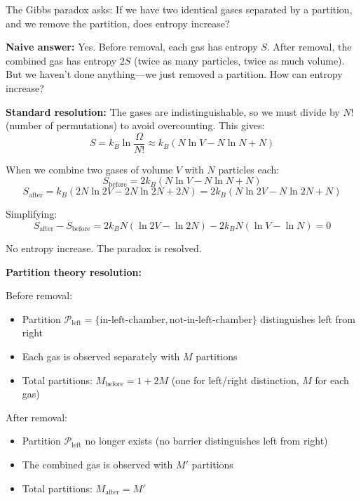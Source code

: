 \documentclass[twocolumn,10pt]{article}
\theoremstyle{definition}
\theoremstyle{remark}
\begin{document}
The Gibbs paradox\cite{gibbs1902} asks: If we have two identical gases separated by a partition, and we remove the partition, does entropy increase?

\vspace{0.2cm}
\noindent\textbf{Naive answer:} Yes. Before removal, each gas has entropy $S$. After removal, the combined gas has entropy $2S$ (twice as many particles, twice as much volume). But we haven't done anything—we just removed a partition. How can entropy increase?

\vspace{0.2cm}
\noindent\textbf{Standard resolution:} The gases are indistinguishable, so we must divide by $N!$ (number of permutations) to avoid overcounting. This gives:
\begin{equation}
S = k_B \ln \frac{\Omega}{N!} \approx k_B (N \ln V - N \ln N + N)
\end{equation}

When we combine two gases of volume $V$ with $N$ particles each:
\begin{equation}
S_{\text{before}} = 2k_B (N \ln V - N \ln N + N)
\end{equation}
\begin{equation}
S_{\text{after}} = k_B (2N \ln 2V - 2N \ln 2N + 2N) = 2k_B (N \ln 2V - N \ln 2N + N)
\end{equation}

Simplifying:
\begin{equation}
S_{\text{after}} - S_{\text{before}} = 2k_B N (\ln 2V - \ln 2N) - 2k_B N (\ln V - \ln N) = 0
\end{equation}

No entropy increase. The paradox is resolved.

\vspace{0.2cm}
\noindent\textbf{Partition theory resolution:}

Before removal:
\begin{itemize}
\item Partition $\mathcal{P}_{\text{left}} = \{\text{in-left-chamber}, \text{not-in-left-chamber}\}$ distinguishes left from right
\item Each gas is observed separately with $M$ partitions
\item Total partitions: $M_{\text{before}} = 1 + 2M$ (one for left/right distinction, $M$ for each gas)
\end{itemize}

After removal:
\begin{itemize}
\item Partition $\mathcal{P}_{\text{left}}$ no longer exists (no barrier distinguishes left from right)
\item The combined gas is observed with $M'$ partitions
\item Total partitions: $M_{\text{after}} = M'$
\end{itemize}
\end{document}
